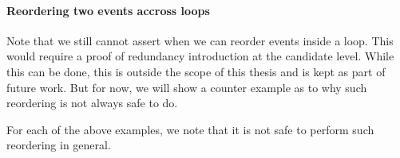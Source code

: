         \paragraph{Reordering two events accross loops} 
            
            Note that we still cannot assert when we can reorder events inside a loop. This would require a proof of redundancy introduction at the candidate level. While this can be done, this is outside the scope of this thesis and is kept as part of future work. But for now, we will show a counter example as to why such reordering is not always safe to do. 





            For each of the above examples, we note that it is not safe to perform such reordering in general. 
